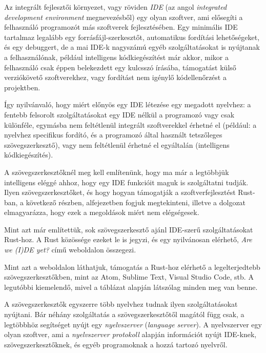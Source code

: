 

Az integrált fejlesztői környezet, vagy röviden \emph{IDE} (az angol \emph{integrated development environment} megnevezésből) 
egy olyan szoftver, ami elősegíti a felhasználó programozót más szoftverek fejlesztésében. 
Egy minimális IDE tartalmaz legalább egy forrásfájl-szerkesztőt, automatikus fordítási lehetőségeket, 
és egy debuggert, de a mai IDE-k nagyszámú egyéb szolgáltatásokat is nyújtanak a felhasználónak, 
például intelligens kódkiegészítést már akkor, mikor a felhasználó csak éppen belekezdett egy kulcsszó írásába, 
támogatást külső verziókövető szoftverekhez, vagy fordítást nem igénylő kódellenőrzést a projektben.

Így nyilvánvaló, hogy miért előnyös egy IDE létezése egy megadott nyelvhez: 
a fentebb felsorolt szolgáltatásokat egy IDE nélkül a programozó vagy csak különféle, egymásba nem feltétlenül integrált szoftverekkel érhetné el 
(például: a nyelvhez specifikus fordító, és a programozó által használt tetszőleges szövegszerkesztő), 
vagy nem feltétlenül érhetné el egyáltalán (intelligens kódkiegészítés).

A szövegszerkesztőknél meg kell említenünk, hogy ma már a legtöbbjük intelligens eléggé ahhoz, 
hogy egy IDE funkcióit maguk is szolgáltatni tudják. Ilyen szövegszerkesztőket, 
és hogy hogyan támogatják a szoftverfejlesztést Rust-ban, a következő részben, 
 alfejezetben fogjuk megtekinteni, illetve a dolgozat elmagyarázza, hogy ezek a megoldások miért nem elégségesek.

\label{sec:ides}

Mint azt már említettük, sok szövegszerkesztő ajánl IDE-szerű szolgáltatásokat Rust-hoz. 
A Rust közössége ezeket le is jegyzi, és egy nyilvánosan elérhető, 
\emph{Are we (I)DE yet?}\cite{ideyet} című weboldalon összegezi.

Mint azt a weboldalon láthatjuk, támogatás a Rust-hoz elérhető a legelterjedtebb szövegszerkesztőkben, 
mint az Atom, Sublime Text, Visual Studio Code, stb. 
A legutóbbi kiemelendő, mivel a táblázat alapján látszólag minden meg van benne.

A szövegszerkesztők egyszerre több nyelvhez tudnak ilyen szolgáltatásokat nyújtani. 
Bár néhány szolgáltatás a szövegszerkesztőtől magától függ csak, a legtöbbhöz segítséget nyújt egy \emph{nyelvszerver} (\emph{language server}). 
A nyelvszerver egy olyan szoftver, ami a \emph{nyelvszerver protokoll}\cite{lsp} alapján információt nyújt IDE-knek, szövegszerkesztőknek, és egyéb programoknak a hozzá tartozó nyelvről.


